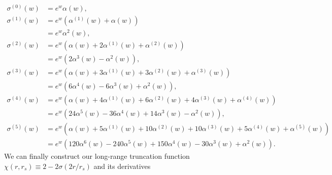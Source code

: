 \begin{align}
  \sigma^{(0)}(w) &= e^w\alpha(w), \nonumber\\
  \sigma^{(1)}(w) &= e^w\left(\alpha^{(1)}(w) + \alpha(w) \right) \nonumber\\
                  &= e^w \alpha^2(w), \nonumber \\
  \sigma^{(2)}(w) &= e^w\left(\alpha(w) +2\alpha^{(1)}(w) + \alpha^{(2)}(w)  \right) \nonumber\\
                  &= e^w \left(2\alpha^3(w) - \alpha^2(w)\right), \nonumber \\
  \sigma^{(3)}(w) &= e^w\left(\alpha(w) + 3\alpha^{(1)}(w) + 3\alpha^{(2)}(w) + \alpha^{(3)}(w)  \right) \nonumber\\
                  &= e^w \left(6\alpha^4(w) - 6\alpha^3(w) + \alpha^2(w)\right), \nonumber \\
  \sigma^{(4)}(w) &= e^w\left(\alpha(w) + 4\alpha^{(1)}(w) + 6\alpha^{(2)}(w) + 4\alpha^{(3)}(w) + \alpha^{(4)}(w)  \right) \nonumber\\
                  &= e^w \left(24\alpha^5(w) - 36\alpha^4(w) + 14\alpha^3(w) - \alpha^2(w)\right), \nonumber \\
  \sigma^{(5)}(w) &= e^w\left(\alpha(w) + 5\alpha^{(1)}(w) + 10\alpha^{(2)}(w) + 10\alpha^{(3)}(w) + 5\alpha^{(4)}(w) + \alpha^{(5)}(w)  \right) \nonumber\\
                  &= e^w \left(120\alpha^6(w) - 240\alpha^5(w) + 150\alpha^4(w) - 30\alpha^3(w) + \alpha^2(w)\right). \nonumber 
\end{align}
We can finally construct our long-range truncation function
$\chi(r,r_s) \equiv 2 - 2\sigma(2r/r_s)$ and its derivatives
